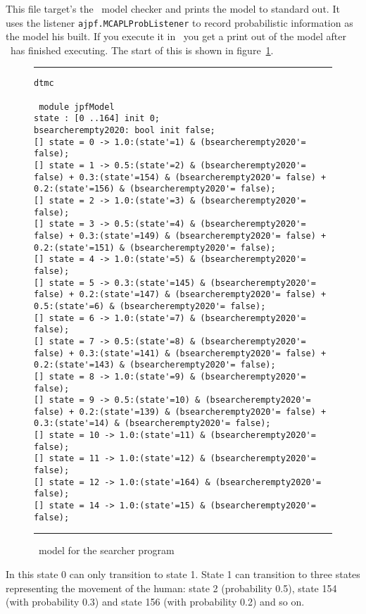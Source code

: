 \documentclass[a4]{article}
\begin{document}
This file target's the \prism\ model checker and prints the model to standard out.  It uses the listener \texttt{ajpf.MCAPLProbListener} to record probabilistic information as the model his built.  If you execute it in \ajpf\ you get a print out of the model after \ajpf\  has finished executing.  The start of this is shown in figure~\ref{fig:prism_output2}.

\begin{figure}
\noindent\rule{\textwidth}{1pt}
\begin{small}
\begin{verbatim}
dtmc

 module jpfModel
state : [0 ..164] init 0;
bsearcherempty2020: bool init false;
[] state = 0 -> 1.0:(state'=1) & (bsearcherempty2020'= false);
[] state = 1 -> 0.5:(state'=2) & (bsearcherempty2020'= false) + 0.3:(state'=154) & (bsearcherempty2020'= false) + 0.2:(state'=156) & (bsearcherempty2020'= false);
[] state = 2 -> 1.0:(state'=3) & (bsearcherempty2020'= false);
[] state = 3 -> 0.5:(state'=4) & (bsearcherempty2020'= false) + 0.3:(state'=149) & (bsearcherempty2020'= false) + 0.2:(state'=151) & (bsearcherempty2020'= false);
[] state = 4 -> 1.0:(state'=5) & (bsearcherempty2020'= false);
[] state = 5 -> 0.3:(state'=145) & (bsearcherempty2020'= false) + 0.2:(state'=147) & (bsearcherempty2020'= false) + 0.5:(state'=6) & (bsearcherempty2020'= false);
[] state = 6 -> 1.0:(state'=7) & (bsearcherempty2020'= false);
[] state = 7 -> 0.5:(state'=8) & (bsearcherempty2020'= false) + 0.3:(state'=141) & (bsearcherempty2020'= false) + 0.2:(state'=143) & (bsearcherempty2020'= false);
[] state = 8 -> 1.0:(state'=9) & (bsearcherempty2020'= false);
[] state = 9 -> 0.5:(state'=10) & (bsearcherempty2020'= false) + 0.2:(state'=139) & (bsearcherempty2020'= false) + 0.3:(state'=14) & (bsearcherempty2020'= false);
[] state = 10 -> 1.0:(state'=11) & (bsearcherempty2020'= false);
[] state = 11 -> 1.0:(state'=12) & (bsearcherempty2020'= false);
[] state = 12 -> 1.0:(state'=164) & (bsearcherempty2020'= false);
[] state = 14 -> 1.0:(state'=15) & (bsearcherempty2020'= false);
\end{verbatim}
\end{small}
\noindent\rule{\textwidth}{1pt}
\caption{\prism\ model for the searcher program}
\label{fig:prism_output2}
\end{figure}

In this state 0 can only transition to state 1.  State 1 can transition to three states representing the movement of the human: state 2 (probability 0.5), state 154 (with probability 0.3) and state 156 (with probability 0.2) and so on.
\end{document}
